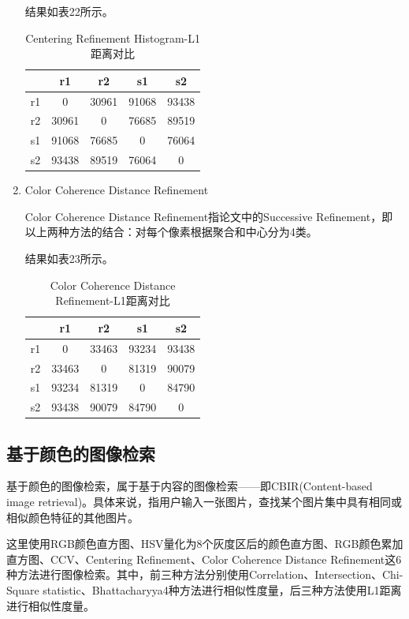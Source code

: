 \documentclass[a4paper, 12pt, UTF8]{article}
\begin{document}
\begin{enumerate}
结果如表22所示。

\begin{table}[h!]
    \centering
    \caption{Centering Refinement Histogram-L1距离对比}
    \begin{tabular}{ccccc}
         & r1 & r2 & s1 & s2 \\ \hline
        r1 & 0 & 30961 & 91068 & 93438 \\ \hline
        r2 & 30961 & 0 & 76685 & 89519 \\ \hline
        s1 & 91068 & 76685 & 0 & 76064 \\ \hline
        s2 & 93438 & 89519 & 76064 & 0 \\ \hline
    \end{tabular}
\end{table}

\item Color Coherence Distance Refinement

Color Coherence Distance Refinement指论文\cite{ref2}中的Successive Refinement，即以上两种方法的结合：对每个像素根据聚合和中心分为4类。

结果如表23所示。

\begin{table}[h!]
    \centering
    \caption{Color Coherence Distance Refinement-L1距离对比}
    \begin{tabular}{ccccc}
         & r1 & r2 & s1 & s2 \\ \hline
        r1 & 0 & 33463 & 93234 & 93438 \\ \hline
        r2 & 33463 & 0 & 81319 & 90079 \\ \hline
        s1 & 93234 & 81319 & 0 & 84790 \\ \hline
        s2 & 93438 & 90079 & 84790 & 0 \\ \hline
    \end{tabular}
\end{table}

\end{enumerate}


\subsection{基于颜色的图像检索}

基于颜色的图像检索，属于基于内容的图像检索——即CBIR(Content-based image retrieval)。具体来说，指用户输入一张图片，查找某个图片集中具有相同或相似颜色特征的其他图片。

这里使用RGB颜色直方图、HSV量化为8个灰度区后的颜色直方图、RGB颜色累加直方图、CCV、Centering Refinement、Color Coherence Distance Refinement这6种方法进行图像检索。其中，前三种方法分别使用Correlation、Intersection、Chi-Square statistic、Bhattacharyya4种方法进行相似性度量，后三种方法使用L1距离进行相似性度量。
\end{document}
